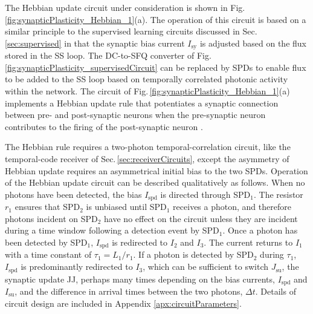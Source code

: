 \documentclass[twocolumn]{article}
\begin{document}
The Hebbian update circuit under consideration is shown in Fig. \ref{fig:synapticPlasticity_Hebbian_1}(a). The operation of this circuit is based on a similar principle to the supervised learning circuits discussed in Sec.\,\ref{sec:supervised} in that the synaptic bias current $I_{\mathrm{sy}}$ is adjusted based on the flux stored in the SS loop. The DC-to-SFQ converter of Fig.\,\ref{fig:synapticPlasticity_supervisedCircuit} can be replaced by SPDs to enable flux to be added to the SS loop based on temporally correlated photonic activity within the network. The circuit of Fig.\,\ref{fig:synapticPlasticity_Hebbian_1}(a) implements a Hebbian update rule that potentiates a synaptic connection between pre- and post-synaptic neurons when the pre-synaptic neuron contributes to the firing of the post-synaptic neuron \cite{daab2001}. 

The Hebbian rule requires a two-photon temporal-correlation circuit, like the temporal-code receiver of Sec.\,\ref{sec:receiverCircuits}, except the asymmetry of Hebbian update requires an asymmetrical initial bias to the two SPDs. Operation of the Hebbian update circuit can be described qualitatively as follows. When no photons have been detected, the bias $I_{\mathrm{spd}}$ is directed through SPD$_1$. The resistor $r_1$ ensures that SPD$_2$ is unbiased until SPD$_1$ receives a photon, and therefore photons incident on SPD$_2$ have no effect on the circuit unless they are incident during a time window following a detection event by SPD$_1$. Once a photon has been detected by SPD$_1$, $I_{\mathrm{spd}}$ is redirected to $I_2$ and $I_3$. The current returns to $I_1$ with a time constant of $\tau_1 = L_1/r_1$. If a photon is detected by SPD$_2$ during $\tau_1$, $I_{\mathrm{spd}}$ is predominantly redirected to $I_3$, which can be sufficient to switch $J_{\mathrm{su}}$, the synaptic update JJ, perhaps many times depending on the bias currents, $I_{\mathrm{spd}}$ and $I_{\mathrm{su}}$, and the difference in arrival times between the two photons, $\Delta t$. Details of circuit design are included in Appendix \ref{apx:circuitParameters}.
\end{document}
